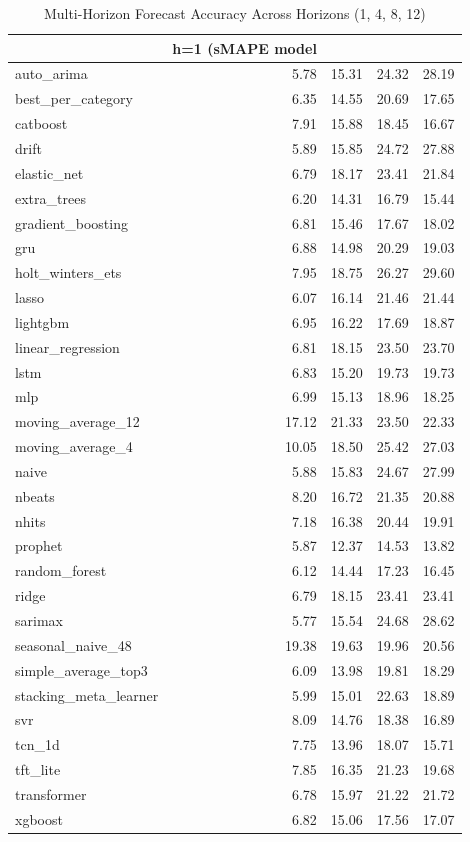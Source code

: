 \begin{table}
\caption{Multi-Horizon Forecast Accuracy Across Horizons (1, 4, 8, 12)}
\begin{tabular}{lrrrr}
\toprule
 & h=1 (sMAPE %
model &  &  &  &  \\
\midrule
auto_arima & 5.78 & 15.31 & 24.32 & 28.19 \\
best_per_category & 6.35 & 14.55 & 20.69 & 17.65 \\
catboost & 7.91 & 15.88 & 18.45 & 16.67 \\
drift & 5.89 & 15.85 & 24.72 & 27.88 \\
elastic_net & 6.79 & 18.17 & 23.41 & 21.84 \\
extra_trees & 6.20 & 14.31 & 16.79 & 15.44 \\
gradient_boosting & 6.81 & 15.46 & 17.67 & 18.02 \\
gru & 6.88 & 14.98 & 20.29 & 19.03 \\
holt_winters_ets & 7.95 & 18.75 & 26.27 & 29.60 \\
lasso & 6.07 & 16.14 & 21.46 & 21.44 \\
lightgbm & 6.95 & 16.22 & 17.69 & 18.87 \\
linear_regression & 6.81 & 18.15 & 23.50 & 23.70 \\
lstm & 6.83 & 15.20 & 19.73 & 19.73 \\
mlp & 6.99 & 15.13 & 18.96 & 18.25 \\
moving_average_12 & 17.12 & 21.33 & 23.50 & 22.33 \\
moving_average_4 & 10.05 & 18.50 & 25.42 & 27.03 \\
naive & 5.88 & 15.83 & 24.67 & 27.99 \\
nbeats & 8.20 & 16.72 & 21.35 & 20.88 \\
nhits & 7.18 & 16.38 & 20.44 & 19.91 \\
prophet & 5.87 & 12.37 & 14.53 & 13.82 \\
random_forest & 6.12 & 14.44 & 17.23 & 16.45 \\
ridge & 6.79 & 18.15 & 23.41 & 23.41 \\
sarimax & 5.77 & 15.54 & 24.68 & 28.62 \\
seasonal_naive_48 & 19.38 & 19.63 & 19.96 & 20.56 \\
simple_average_top3 & 6.09 & 13.98 & 19.81 & 18.29 \\
stacking_meta_learner & 5.99 & 15.01 & 22.63 & 18.89 \\
svr & 8.09 & 14.76 & 18.38 & 16.89 \\
tcn_1d & 7.75 & 13.96 & 18.07 & 15.71 \\
tft_lite & 7.85 & 16.35 & 21.23 & 19.68 \\
transformer & 6.78 & 15.97 & 21.22 & 21.72 \\
xgboost & 6.82 & 15.06 & 17.56 & 17.07 \\
\bottomrule
\end{tabular}
\end{table}

